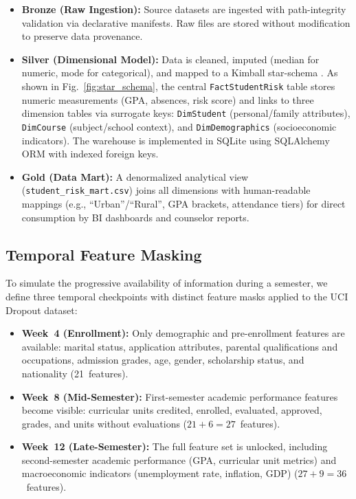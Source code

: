 \documentclass[conference,a4paper]{IEEEtran}
\begin{document}
\begin{itemize}[leftmargin=*]
\item \textbf{Bronze (Raw Ingestion):} Source datasets are ingested with path-integrity validation via declarative manifests. Raw files are stored without modification to preserve data provenance.

\item \textbf{Silver (Dimensional Model):} Data is cleaned, imputed (median for numeric, mode for categorical), and mapped to a Kimball star-schema \cite{kimball2013dw}. As shown in Fig.~\ref{fig:star_schema}, the central \texttt{FactStudentRisk} table stores numeric measurements (GPA, absences, risk score) and links to three dimension tables via surrogate keys: \texttt{DimStudent} (personal/family attributes), \texttt{DimCourse} (subject/school context), and \texttt{DimDemographics} (socioeconomic indicators). The warehouse is implemented in SQLite using SQLAlchemy ORM with indexed foreign keys.

\item \textbf{Gold (Data Mart):} A denormalized analytical view (\texttt{student\_risk\_mart.csv}) joins all dimensions with human-readable mappings (e.g., ``Urban''/``Rural'', GPA brackets, attendance tiers) for direct consumption by BI dashboards and counselor reports.
\end{itemize}

\subsection{Temporal Feature Masking}\label{sec:temporal}

To simulate the progressive availability of information during a semester, we define three temporal checkpoints with distinct feature masks applied to the UCI Dropout dataset:

\begin{itemize}[leftmargin=*]
\item \textbf{Week~4 (Enrollment):} Only demographic and pre-enrollment features are available: marital status, application attributes, parental qualifications and occupations, admission grades, age, gender, scholarship status, and nationality (21~features).

\item \textbf{Week~8 (Mid-Semester):} First-semester academic performance features become visible: curricular units credited, enrolled, evaluated, approved, grades, and units without evaluations ($21 + 6 = 27$~features).

\item \textbf{Week~12 (Late-Semester):} The full feature set is unlocked, including second-semester academic performance (GPA, curricular unit metrics) and macroeconomic indicators (unemployment rate, inflation, GDP) ($27 + 9 = 36$~features).
\end{itemize}
\end{document}
